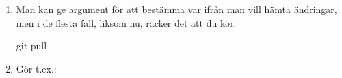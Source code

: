 \begin{enumerate}[label=C\arabic*]
	\item\label{git-pull-term} Man kan ge argument för att bestämma var ifrån man vill hämta ändringar, men i de flesta fall, liksom nu, räcker det att du kör:
	      \begin{Code}
		      git pull
	      \end{Code}

	\item\label{git-conflict-1} Gör t.ex.:


\end{enumerate}
